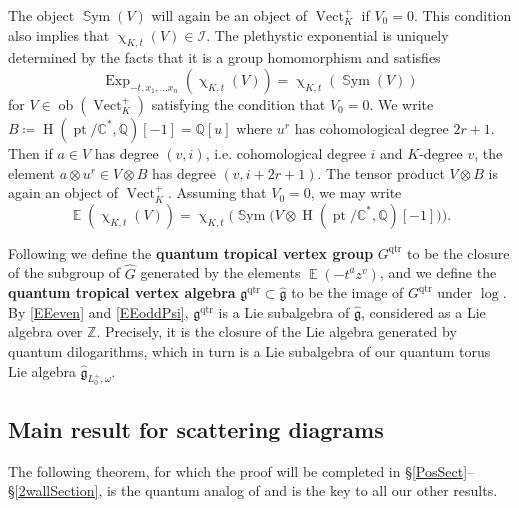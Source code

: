 \documentclass{amsart}
\DeclareMathOperator{\Vect}{Vect}
\DeclareMathOperator{\pt}{pt}
\DeclareMathOperator{\Sym}{\mathbb{S}ym}
\DeclareMathOperator{\HO}{H}
\DeclareMathOperator{\qtrop}{qtr}
\DeclareMathOperator{\EE}{\mathbb{E}}
\DeclareMathOperator{\ob}{ob}
\DeclareMathOperator{\Exp}{Exp}
\let\f=\mathfrak
\renewcommand{\chi}{\upchi}
\theoremstyle{plain}%
\theoremstyle{definition}
\theoremstyle{remark}
\begin{document}
The object $\Sym(V)$ will again be an object of $\Vect_K^+$ if $V_0=0$.  This condition also implies that $\chi_{K,t}(V)\in\mathscr{I}$.  The plethystic exponential is uniquely determined by the facts that it is a group homomorphism and satisfies
\begin{equation}
\label{cat_Exp}
\Exp_{-t,x_1,\ldots x_n}(\chi_{K,t}(V))=\chi_{K,t}(\Sym(V))
\end{equation}
for $V\in\ob(\Vect_K^+)$ satisfying the condition that $V_0=0$.  We write $B\coloneqq \HO(\pt/\mathbb{C}^*,\mathbb{Q})[-1]=\mathbb{Q}[u]$ where $u^r$ has cohomological degree $2r+1$.  Then if $a\in V$ has degree $(v,i)$, i.e. cohomological degree $i$ and $K$-degree $v$, the element $a\otimes u^r\in V\otimes B$ has degree $(v,i+2r+1)$.  The tensor product $V\otimes B$ is again an object of $\Vect_K^+$.  Assuming that $V_0=0$, we may write
\begin{equation}
\label{cat_Expb}
\EE(\chi_{K,t}(V))=\chi_{K,t}\big(\Sym\big(V\otimes \HO(\pt/\mathbb{C}^*,\mathbb{Q})[-1]\big)\big).
\end{equation}





Following \cite[Sec. 6.1]{CoHA} we define the \textbf{quantum tropical vertex group} $G^{\qtrop}$ to be the closure of the subgroup of $\hat{G}$ generated by the elements $\EE(-t^a z^v)$, and we define the \textbf{quantum tropical vertex algebra} $\mathfrak{g}^{\qtrop}\subset \hat{\mathfrak{g}}$ to be the image of $G^{\qtrop}$ under $\log$.  By \eqref{EEeven} and \eqref{EEoddPsi}, $\mathfrak{g}^{\qtrop}$ is a Lie subalgebra of $\hat{\f{g}}$, considered as a Lie algebra over $\mathbb{Z}$.  Precisely, it is the closure of the Lie algebra generated by quantum dilogarithms, which in turn is a Lie subalgebra of our quantum torus Lie algebra $\hat{\f{g}}_{L_0^+,\omega}$.


\subsection{Main result for scattering diagrams} 

The following theorem, for which the proof will be completed in \S \ref{PosSect}--\S\ref{2wallSection}, is the quantum analog of \cite[Thm. 1.13]{GHKK} and is the key to all our other results.
\end{document}
